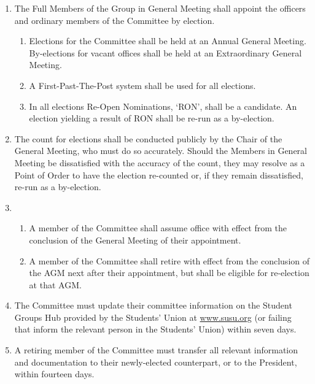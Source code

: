 \documentclass[12pt]{constitution}
\begin{document}
\begin{enumerate}
    \item The Full Members of the Group in General Meeting shall appoint the officers and ordinary members of the Committee by election.
    \begin{enumerate}
        \item Elections for the Committee shall be held at an Annual General Meeting.  By-elections for vacant offices shall be held at an Extraordinary General Meeting.
        \item A First-Past-The-Post system shall be used for all elections.
        \item In all elections Re-Open Nominations, `RON', shall be a candidate.  An election yielding a result of RON shall be re-run as a by-election.
    \end{enumerate}

    \item The count for elections shall be conducted publicly by the Chair of the General Meeting, who must do so accurately.  Should the Members in General Meeting be dissatisfied with the accuracy of the count, they may resolve as a Point of Order to have the election re-counted or, if they remain dissatisfied, re-run as a by-election.

    \item \begin{enumerate}
        \item A member of the Committee shall assume office with effect from the conclusion of the General Meeting of their appointment.
        \item A member of the Committee shall retire with effect from the conclusion of the AGM next after their appointment, but shall be eligible for re-election at that AGM.
    \end{enumerate}

    \item The Committee must update their committee information on the Student Groups Hub provided by the Students' Union at \url{www.susu.org} (or failing that inform the relevant person in the Students' Union) within seven days.
    \item A retiring member of the Committee must transfer all relevant information and documentation to their newly-elected counterpart, or to the President, within fourteen days.
\end{enumerate}

\end{document}
